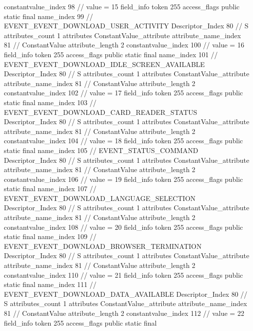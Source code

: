 {{{{{{{					constantvalue_index	98		// value = 15
				}
				}
			}
			field_info {
				token	255
				access_flags	public static final
				name_index	99		// EVENT_EVENT_DOWNLOAD_USER_ACTIVITY
				Descriptor_Index	80		// S
				attributes_count	1
				attributes {
				ConstantValue_attribute {
					attribute_name_index	81		// ConstantValue
					attribute_length	2
					constantvalue_index	100		// value = 16
				}
				}
			}
			field_info {
				token	255
				access_flags	public static final
				name_index	101		// EVENT_EVENT_DOWNLOAD_IDLE_SCREEN_AVAILABLE
				Descriptor_Index	80		// S
				attributes_count	1
				attributes {
				ConstantValue_attribute {
					attribute_name_index	81		// ConstantValue
					attribute_length	2
					constantvalue_index	102		// value = 17
				}
				}
			}
			field_info {
				token	255
				access_flags	public static final
				name_index	103		// EVENT_EVENT_DOWNLOAD_CARD_READER_STATUS
				Descriptor_Index	80		// S
				attributes_count	1
				attributes {
				ConstantValue_attribute {
					attribute_name_index	81		// ConstantValue
					attribute_length	2
					constantvalue_index	104		// value = 18
				}
				}
			}
			field_info {
				token	255
				access_flags	public static final
				name_index	105		// EVENT_STATUS_COMMAND
				Descriptor_Index	80		// S
				attributes_count	1
				attributes {
				ConstantValue_attribute {
					attribute_name_index	81		// ConstantValue
					attribute_length	2
					constantvalue_index	106		// value = 19
				}
				}
			}
			field_info {
				token	255
				access_flags	public static final
				name_index	107		// EVENT_EVENT_DOWNLOAD_LANGUAGE_SELECTION
				Descriptor_Index	80		// S
				attributes_count	1
				attributes {
				ConstantValue_attribute {
					attribute_name_index	81		// ConstantValue
					attribute_length	2
					constantvalue_index	108		// value = 20
				}
				}
			}
			field_info {
				token	255
				access_flags	public static final
				name_index	109		// EVENT_EVENT_DOWNLOAD_BROWSER_TERMINATION
				Descriptor_Index	80		// S
				attributes_count	1
				attributes {
				ConstantValue_attribute {
					attribute_name_index	81		// ConstantValue
					attribute_length	2
					constantvalue_index	110		// value = 21
				}
				}
			}
			field_info {
				token	255
				access_flags	public static final
				name_index	111		// EVENT_EVENT_DOWNLOAD_DATA_AVAILABLE
				Descriptor_Index	80		// S
				attributes_count	1
				attributes {
				ConstantValue_attribute {
					attribute_name_index	81		// ConstantValue
					attribute_length	2
					constantvalue_index	112		// value = 22
				}
				}
			}
			field_info {
				token	255
				access_flags	public static final
}}}}}
